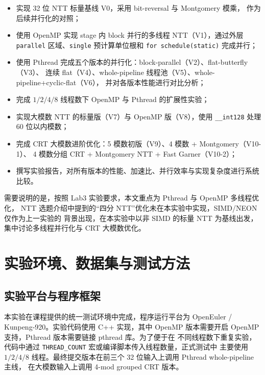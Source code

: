 \documentclass[UTF8,a4paper,10pt]{ctexart}
\begin{document}
\begin{itemize}
  \item 实现 32 位 NTT 标量基线 V0，采用 bit-reversal 与 Montgomery 模乘\cite{montgomery1985modular}，
        作为后续并行化的对照；
  \item 使用 OpenMP 实现 stage 内 block 并行的多线程 NTT（V1），通过外层 \texttt{parallel}
        区域、\texttt{single} 预计算单位根和 \texttt{for schedule(static)} 完成并行；
  \item 使用 Pthread 完成五个版本的并行化：block-parallel（V2）、flat-butterfly（V3）、
        连续 flat（V4）、whole-pipeline 线程池（V5）、whole-pipeline+cyclic-flat（V6），
        并对各版本性能进行对比分析；
  \item 完成 $1/2/4/8$ 线程数下 OpenMP 与 Pthread 的扩展性实验；
  \item 实现大模数 NTT 的标量版（V7）与 OpenMP 版（V8），使用 \texttt{\_\_int128}
        处理 60 位以内模数；
  \item 完成 CRT 大模数进阶优化：5 模数初版（V9）、4 模数 + Montgomery（V10-1）、
        4 模数分组 CRT + Montgomery NTT + Fast Garner（V10-2）；
  \item 撰写实验报告，对所有版本的性能、加速比、并行效率与实现复杂度进行系统比较。
\end{itemize}

需要说明的是，按照 Lab3 实验要求，本文重点为 Pthread 与 OpenMP 多线程优化，
NTT 选题介绍中提到的“四分 NTT”优化未在本实验中实现，SIMD/NEON 仅作为上一实验的
背景出现，在本实验中以非 SIMD 的标量 NTT 为基线出发，集中讨论多线程并行化与 CRT
大模数优化。


\section{实验环境、数据集与测试方法}

\subsection{实验平台与程序框架}

本实验在课程提供的统一测试环境中完成，程序运行平台为 OpenEuler / Kunpeng-920。实验代码使用
C++ 实现，其中 OpenMP 版本需要开启 OpenMP 支持，Pthread 版本需要链接 pthread 库。为了便于在
不同线程数下重复实验，代码中通过 \texttt{THREAD\_COUNT} 宏或编译脚本传入线程数量，正式测试中
主要使用 $1/2/4/8$ 线程。最终提交版本在前三个 32 位输入上调用 Pthread whole-pipeline 主线，
在大模数输入上调用 4-mod grouped CRT 版本。
\end{document}

